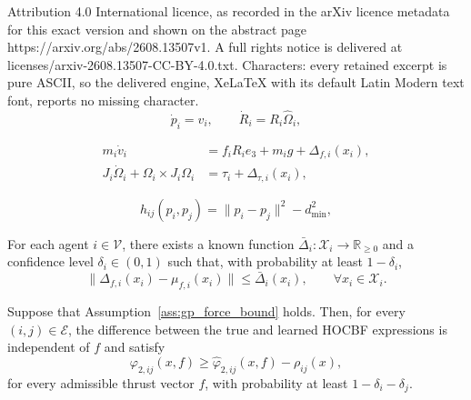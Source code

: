 \documentclass[10pt,a4paper]{amsart}
\begin{document}
Attribution 4.0 International licence, as recorded in the arXiv licence metadata for this exact version and shown on the abstract page https://arxiv.org/abs/2608.13507v1. A full rights notice is delivered at licenses/arxiv-2608.13507-CC-BY-4.0.txt. Characters: every retained excerpt is pure ASCII, so the delivered engine, XeLaTeX with its default Latin Modern text font, reports no missing character.
\begin{equation}
    \dot p_i=v_i,
    \qquad
    \dot R_i=R_i\widehat\Omega_i ,
    \label{eq:kinematics}
\end{equation}

\begin{align}
    m_i\dot v_i
    &=
    f_iR_ie_3+m_i g+\Delta_{f,i}(x_i),
    \label{eq:trans_dyn}
    \\
    J_i\dot\Omega_i+\Omega_i\times J_i\Omega_i
    &=
    \tau_i+\Delta_{\tau,i}(x_i),
    \label{eq:rot_dyn}
\end{align}

\begin{equation}
    h_{ij}(p_i,p_j)
    =
    \|p_i-p_j\|^2-d_{\min}^2,
    \label{eq:pairwise_safety_function}
\end{equation}

\begin{assumption}
\label{ass:gp_force_bound}
For each agent $i\in\mathcal V$, there exists a known function
$\bar\Delta_i:\mathcal X_i\rightarrow\mathbb R_{\geq0}$ and
a confidence level $\delta_i\in(0,1)$ such that, with probability at least $1-\delta_i$,
\begin{equation}
    \|\Delta_{f,i}(x_i)-\mu_{f,i}(x_i)\|
    \leq
    \bar\Delta_i(x_i),
    \qquad
    \forall x_i\in\mathcal X_i.
    \label{eq:force_confidence_bound}
\end{equation}
\end{assumption}

\begin{lemma}\label{lem:robust_hocbf_deviation} 
Suppose that Assumption~\ref{ass:gp_force_bound} holds. Then, for
every $(i,j)\in\mathcal E$, the difference between the true and learned HOCBF expressions is independent of $f$ and satisfy
\begin{equation}
    \varphi_{2,ij}(x,f)
    \geq
    \widehat\varphi_{2,ij}(x,f)
    -
    \rho_{ij}(x),
    \label{eq:robust_hocbf_bound}
\end{equation}
for every admissible thrust vector $f$, with probability at least $1-\delta_i-\delta_j$.
\end{lemma}
\end{document}
